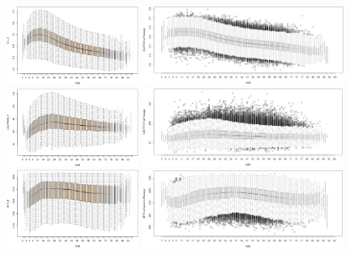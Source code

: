 \documentclass{cta-author}%
\begin{document}
\begin{figure}[!t]

\includegraphics[width=0.5\linewidth,height=1in]{eps/21DIL_E=f(AGE)-boxplot(Cam=B).eps}\quad
\includegraphics[width=0.5\linewidth,height=1in]{eps/DIL-PA.eps} 
\includegraphics[width=0.5\linewidth,height=1in]{eps/21CONTRAST_E=f(AGE)-boxplot(Cam=B).eps}\quad
\includegraphics[width=0.5\linewidth,height=1in]{eps/CONTRAST-PA.eps}
\includegraphics[width=0.5\linewidth,height=1in]{eps/21BITS_E=f(AGE)-boxplot(Cam=B).eps}\quad
\includegraphics[width=0.5\linewidth,height=1in]{eps/BITS-COMPARED.eps}\\ 

\vspace{5pt}


\end{figure}
\end{document}
